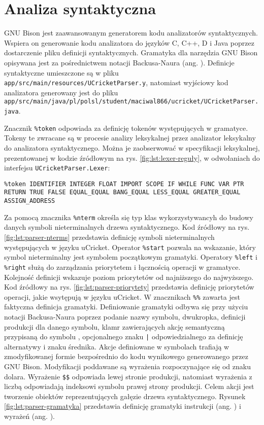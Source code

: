 \section{Analiza syntaktyczna}
GNU Bison \cite{BisonGNUProject} jest zaawansowanym generatorem kodu analizatorów syntaktycznych. Wspiera on generowanie kodu analizatora do języków C, C++, D i Java poprzez dostarczenie pliku definicji syntaktycznych. Gramatyka dla narzędzia GNU Bison opisywana jest za pośrednictwem notacji Backusa-Naura (ang. ). Definicje syntaktyczne umieszczone są w pliku \lstinline|app/src/main/resources/UCricketParser.y|, natomiast wyjściowy kod analizatora generowany jest do pliku \lstinline|app/src/main/java/pl/polsl/student/maciwal866/ucricket/UCricketParser.java|.

Znacznik \lstinline|%token| odpowiada za definicję tokenów występujących w gramatyce. Tokeny te zwracane są w procesie analizy leksykalnej przez analizator leksykalny do analizatora syntaktycznego. Można je zaobserwować w specyfikacji leksykalnej, prezentowanej w kodzie źródłowym na rys. \ref{fig:lst:lexer-reguły}, w odwołaniach do interfejsu \lstinline|UCricketParser.Lexer|:
\begin{lstlisting}
%token IDENTIFIER INTEGER FLOAT IMPORT SCOPE IF WHILE FUNC VAR PTR RETURN TRUE FALSE EQUAL_EQUAL BANG_EQUAL LESS_EQUAL GREATER_EQUAL ASSIGN_ADDRESS
\end{lstlisting} 
Za pomocą znacznika \lstinline|%nterm| określa się typ klas wykorzystywancyh do budowy danych symboli nieterminalnych drzewa syntaktycznego. Kod źródłowy na rys. \ref{fig:lst:parser-nterms} przedstawia definicję symboli nieterminalnych występujących w języku uCricket.
Operator \lstinline|%start| pozwala na wskazanie, który symbol nieterminalny jest symbolem początkowym gramatyki.
Operatory \lstinline|%left| i \lstinline|%right| służą do zarządzania priorytetem i łącznością operacji w gramatyce. Kolejność definicji wskazuje poziom priorytetów od najniższego do najwyższego. Kod źródłowy na rys. \ref{fig:lst:parser-priorytety} przedstawia definicję priorytetów operacji, jakie wsytępują w języku uCricket.
W znacznikach \lstinline|%%| zawarta jest faktyczna definicja gramatyki. Definiowanie gramatyki odbywa się przy użyciu notacji Backusa-Naura poprzez podanie nazwy symbolu, dwukropka, definicji produkcji dla danego symbolu, klamr zawierających akcję semantyczną przypisaną do symbolu , opcjonalnego znaku \lstinline/|/ odpowiedzialnego za definicję alternatywy i znaku średnika. Akcje definiowane w symbolach trafiają w zmodyfikowanej formie bezpośrednio do kodu wynikowego generowanego przez GNU Bison. Modyfikacji poddawane są wyrażenia rozpoczynające się od znaku dolara. Wyrażenie \lstinline|$$| odpowiada lewej stronie produkcji, natomiast wyrażenia z liczbą odpowiadają indeksowi symbolu prawej strony produkcji. Celem akcji jest tworzenie obiektów reprezentujących gałęzie drzewa syntaktycznego. Rysunek \ref{fig:lst:parser-gramatyka} przedstawia definicję gramatyki instrukcji (ang. ) i wyrażeń (ang. ).
